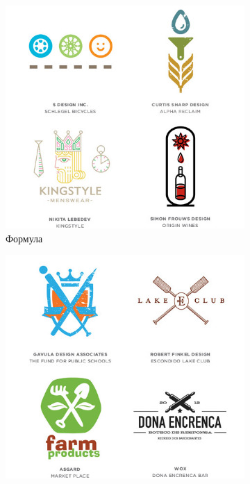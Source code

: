 \begin{figure}[h!]
  \centering
  \begin{subfigure}{.45\textwidth}
    \centering
    \includegraphics[width=\linewidth]{images/supplement/logolounge/2013/Formula}
    \caption{Формула}
    \label{fig:logolounge:2013:formula}
  \end{subfigure}
  \hfill
  \centering
  \begin{subfigure}{.45\textwidth}
    \centering
    \includegraphics[width=\linewidth]{images/supplement/logolounge/2013/Kresti}

\end{subfigure}
\end{figure}
